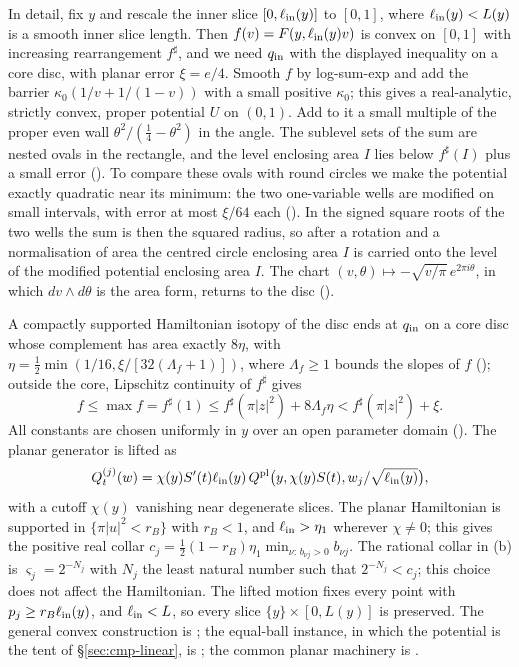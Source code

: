 In detail, fix $y$ and rescale the inner slice $[0,\ell_{\rm in}(y)]$ to $[0,1]$, where $\ell_{\rm in}(y)<L(y)$
is a smooth inner slice length. Then $f(v)=F(y,\ell_{\rm in}(y)v)$ is convex on $[0,1]$ with increasing
rearrangement $f^\sharp$, and we need $q_{\rm in}$ with the displayed inequality on a core disc, with planar
error $\xi=e/4$. Smooth $f$ by log-sum-exp and add the barrier $\kappa_0(1/v+1/(1-v))$ with a small positive
$\kappa_0$; this gives a real-analytic, strictly convex, proper potential $U$ on $(0,1)$. Add to it a small
multiple of the proper even wall $\theta^2/(\frac14-\theta^2)$ in the angle. The sublevel sets of the sum are
nested ovals in the rectangle, and the level enclosing area $I$ lies below $f^\sharp(I)$ plus a small error
(). To compare these ovals with round circles we make the potential exactly quadratic
near its minimum: the two one-variable wells are modified on small intervals, with error at most $\xi/64$ each
(). In the signed square roots of the two wells the sum is then the squared
radius, so after a rotation and a normalisation of area the centred circle enclosing area $I$ is carried onto the
level of the modified potential enclosing area $I$. The chart $(v,\theta)\mapsto-\sqrt{v/\pi}\,e^{2\pi i\theta}$,
in which $dv\wedge d\theta$ is the area form, returns to the disc ().

A compactly supported Hamiltonian isotopy of the disc ends at $q_{\rm in}$ on a core disc whose complement has area
exactly $8\eta$, with $\eta=\tfrac12\min(1/16,\xi/[32(\Lambda_f+1)])$, where $\Lambda_f\ge1$ bounds the slopes of
$f$ (); outside the core, Lipschitz continuity of $f^\sharp$ gives
\[
 f\le\max f=f^\sharp(1)\le f^\sharp(\pi|z|^2)+8\Lambda_f\eta
 <f^\sharp(\pi|z|^2)+\xi.
\]
All constants are chosen uniformly in $y$ over an open parameter domain (). The planar
generator is lifted as
\[
 Q^{(j)}_t(w)=\chi(y)S'(t)\ell_{\rm in}(y)\,
 Q^{\rm pl}\bigl(y,\chi(y)S(t),w_j/\sqrt{\ell_{\rm in}(y)}\bigr),
\]
with a cutoff
$\chi(y)$ vanishing near degenerate slices. The planar Hamiltonian is supported in $\{\pi|u|^2<r_B\}$ with $r_B<1$,
and $\ell_{\rm in}>\eta_1$ wherever $\chi\ne0$; this gives the positive real collar
$c_j=\frac12(1-r_B)\eta_1\min_{\nu:\,b_{\nu j}>0}b_{\nu j}$. The rational collar in (b) is $\varsigma_j=2^{-N_j}$ with $N_j$ the least natural number such that $2^{-N_j}<c_j$;
this choice does not affect the Hamiltonian. The lifted motion fixes every point with
$p_j\ge r_B\ell_{\rm in}(y)$, and $\ell_{\rm in}<L$, so every slice $\{y\}\times[0,L(y)]$ is preserved. The general convex
construction is ; the equal-ball instance, in which the potential is the tent of \S\ref{sec:cmp-linear},
is ; the common planar machinery is .

